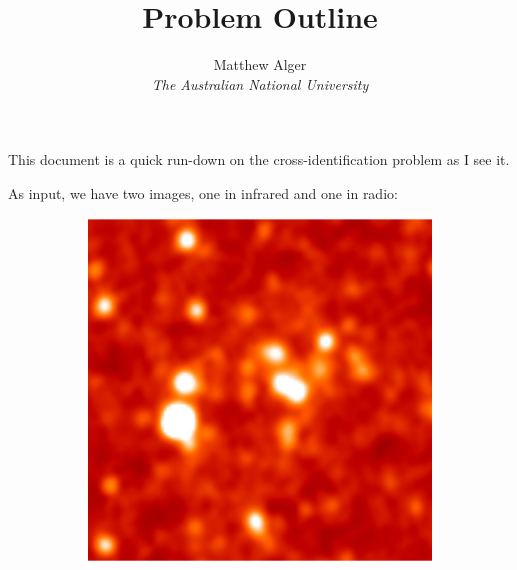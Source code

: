 \documentclass[a4paper]{article}
\begin{document}
    \title{Problem Outline}
    \author{Matthew Alger \\ \emph{The Australian National University}}
    \maketitle

    This document is a quick run-down on the cross-identification problem as I see it.

    As input, we have two images, one in infrared and one in radio:

    \begin{figure}[!ht]
        \centering
        \begin{subfigure}{0.3\textwidth}
            \includegraphics[width=\linewidth]{images/ARG000180p_ir.jpg}
        \end{subfigure}\quad
        \begin{subfigure}{0.3\textwidth}

\end{subfigure}
\end{figure}
\end{document}
